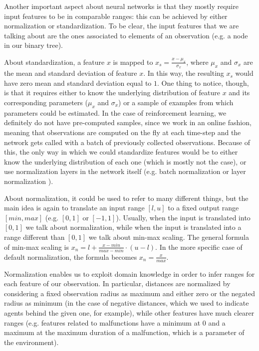 \documentclass[a4paper,10pt]{report}
\begin{document}
Another important aspect about neural networks is that they mostly require input features to be in comparable ranges: this can be achieved by either normalization or standardization. To be clear, the input features that we are talking about are the ones associated to elements of an observation (e.g. a node in our binary tree).

About standardization, a feature $x$ is mapped to $x_s=\frac{x-\mu_x}{\sigma_x}$, where $\mu_x$ and $\sigma_x$ are the mean and standard deviation of feature $x$. In this way, the resulting $x_s$ would have zero mean and standard deviation equal to $1$. One thing to notice, though, is that it requires either to know the underlying distribution of feature $x$ and its corresponding parameters ($\mu_x$ and $\sigma_x$) or a sample of examples from which parameters could be estimated. In the case of reinforcement learning, we definitely do not have pre-computed samples, since we work in an online fashion, meaning that observations are computed on the fly at each time-step and the network gets called with a batch of previously collected observations. Because of this, the only way in which we could standardize features would be to either know the underlying distribution of each one (which is mostly not the case), or use normalization layers in the network itself (e.g. batch normalization \cite{batch-norm} or layer normalization \cite{layer-norm}).

About normalization, it could be used to refer to many different things, but the main idea is again to translate an input range $[l, u]$ to a fixed output range $[min, max]$ (e.g. $[0, 1]$ or $[-1,1]$). Usually, when the input is translated into $[0,1]$ we talk about normalization, while when the input is translated into a range different than $[0,1]$ we talk about min-max scaling. The general formula of min-max scaling is $x_n = l + \frac{x - min}{max - min} \cdot (u - l)$. In the more specific case of default normalization, the formula becomes $x_n = \frac{x}{max}$. 

Normalization enables us to exploit domain knowledge in order to infer ranges for each feature of our observation. In particular, distances are normalized by considering a fixed observation radius as maximum and either zero or the negated radius as minimum (in the case of negative distances, which we used to indicate agents behind the given one, for example), while other features have much clearer ranges (e.g. features related to malfunctions have a minimum at $0$ and a maximum at the maximum duration of a malfunction, which is a parameter of the environment).
\end{document}
